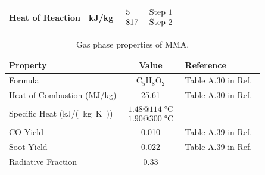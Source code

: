 \begin{table}[!h]
\begin{center}
\begin{tabular}{|l|c|c|c|}
Heat of Reaction            & kJ/kg         & $\begin{array}{ll} 5                   & \hbox{ Step 1} \\ 817                 & \hbox{ Step 2} \end{array}$                                 &                \\ \hline
\end{tabular}
\end{center}
\label{NIST_PMMA_Properties}
\end{table}

\begin{table}[!h]
\caption[Gas phase MMA properties]{Gas phase properties of MMA.}
\begin{center}
\begin{tabular}{|l|c|l|}
\hline
Property                                      & Value                                                                                                & Reference                         \\ \hline \hline
Formula                                       & C$_5$H$_8$O$_2$                                                                                      & Table A.30 in Ref.~\cite{SFPE}    \\ \hline
Heat of Combustion (MJ/kg)                    & 25.61                                                                                                & Table A.30 in Ref.~\cite{SFPE}    \\ \hline
Specific Heat (\unit{kJ/(kg.K)})                       & $\begin{array}{l} 1.48 @ 114 \; \unit{\degreeCelsius} \\ 1.90 @ 300 \; \unit{\degreeCelsius} \end{array}$        & \cite{chemeo}                     \\ \hline
CO Yield                                      & 0.010                                                                                                & Table A.39 in Ref.~\cite{SFPE}    \\ \hline
Soot Yield                                    & 0.022                                                                                                & Table A.39 in Ref.~\cite{SFPE}    \\ \hline
Radiative Fraction                            & 0.33                                                                                                 & \cite{Quintiere:FM2016}           \\ \hline
\end{tabular}
\end{center}
\label{MMA_Gas_Properties}
\end{table}

